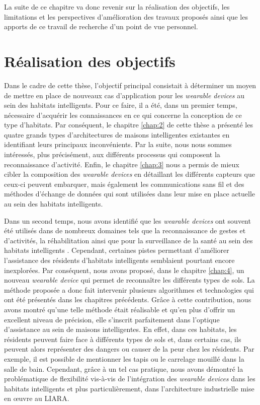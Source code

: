 La suite de ce chapitre va donc revenir sur la réalisation des objectifs, les limitations et les perspectives d’amélioration des travaux proposés ainsi que les apports de ce travail de recherche d’un point de vue personnel.

\section{Réalisation des objectifs}

Dans le cadre de cette thèse, l'objectif principal consistait à déterminer un moyen de mettre en place de nouveaux cas d'application pour les \textit{wearable devices} au sein des habitats intelligents. Pour ce faire, il a été, dans un premier temps, nécessaire d'acquérir les connaissances en ce qui concerne la conception de ce type d'habitats. Par conséquent, le chapitre \ref{chap:2} de cette thèse a présenté les quatre grands types d'architectures de maisons intelligentes existantes en identifiant leurs principaux inconvénients. Par la suite, nous nous sommes intéressés, plus précisément, aux différents processus qui composent la reconnaissance d'activité. Enfin, le chapitre \ref{chap:3} nous a permis de mieux cibler la composition des \textit{wearable devices} en détaillant les différents capteurs que ceux-ci peuvent embarquer, mais également les communications sans fil et des méthodes d'échange de données qui sont utilisées dans leur mise en place actuelle au sein des habitats intelligents.

Dans un second temps, nous avons identifié que les \textit{wearable devices} ont souvent été utilisés dans de nombreux domaines tels que la reconnaissance de gestes et d’activités, la réhabilitation ainsi que pour la surveillance de la santé au sein des habitats intelligents \citep{Khan2016,Davis2016,Chapron2018}. Cependant, certaines pistes permettant d’améliorer l’assistance des résidents d’habitats intelligents semblaient pourtant encore inexplorées. Par conséquent, nous avons proposé, dans le chapitre \ref{chap:4}, un nouveau \textit{wearable device} qui permet de reconnaître les différents types de sols. La méthode proposée a donc fait intervenir plusieurs algorithmes et technologies qui ont été présentés dans les chapitres précédents. Grâce à cette contribution, nous avons montré qu'une telle méthode était réalisable et qu'en plus d'offrir un excellent niveau de précision, elle s'inscrit parfaitement dans l'optique d’assistance au sein de maisons intelligentes. En effet, dans ces habitats, les résidents peuvent faire face à différents types de sols et, dans certains cas, ils peuvent alors représenter des dangers ou causer de la peur chez les résidents. Par exemple, il est possible de mentionner les tapis ou le carrelage mouillé dans la salle de bain. Cependant, grâce à un tel cas pratique, nous avons démontré la problématique de flexibilité vis-à-vis de l'intégration des \textit{wearable devices} dans les habitats intelligents et plus particulièrement, dans l'architecture industrielle mise en \oe{}uvre au \ac{LIARA}.

